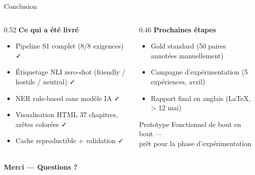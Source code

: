 \documentclass[aspectratio=169]{beamer}
\begin{document}
\begin{frame}{Conclusion}
  \begin{columns}[T]
    \begin{column}{0.52\textwidth}
      \textbf{Ce qui a été livré}
      \begin{itemize}
        \item[\textcolor{done}{\textbullet}] Pipeline S1 complet (8/8 exigences) ✓
        \item[\textcolor{done}{\textbullet}] Étiquetage NLI zero-shot (friendly / hostile / neutral) ✓
        \item[\textcolor{done}{\textbullet}] NER rule-based sans modèle IA ✓
        \item[\textcolor{done}{\textbullet}] Visualisation HTML 37 chapitres, arêtes colorées ✓
        \item[\textcolor{done}{\textbullet}] Cache reproductible + validation ✓
      \end{itemize}
    \end{column}
    \begin{column}{0.46\textwidth}
      \textbf{Prochaines étapes}
      \begin{itemize}
        \item[\textcolor{inprog}{\textbullet}] Gold standard (50 paires annotées manuellement)
        \item[\textcolor{inprog}{\textbullet}] Campagne d'expérimentation (5 expériences, avril)
        \item[\textcolor{nottodo}{\textbullet}] Rapport final en anglais (\LaTeX, > 12 mai)
      \end{itemize}
      \vspace{10pt}
      \begin{block}{Prototype}
        Fonctionnel de bout en bout ---\\
        prêt pour la phase d'expérimentation
      \end{block}
    \end{column}
  \end{columns}
  \vspace{10pt}
  \centering
  \Large\textcolor{mainblue}{\textbf{Merci --- Questions ?}}
\end{frame}
\end{document}
